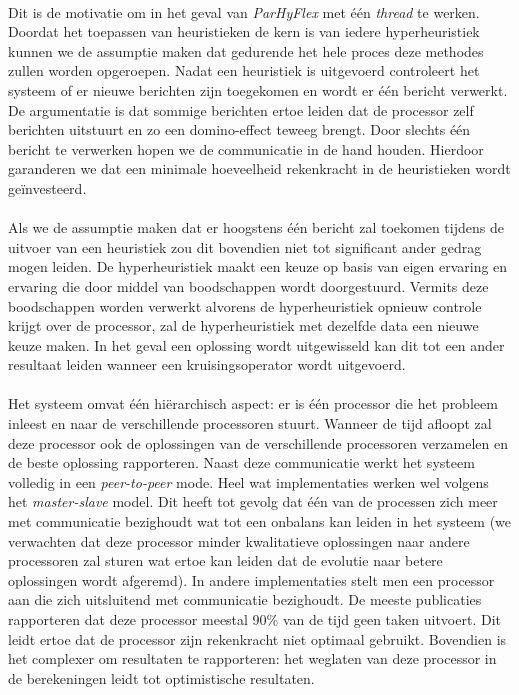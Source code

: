 \paragraph{}
Dit is de motivatie om in het geval van \emph{ParHyFlex} met \'e\'en \emph{thread} te werken. Doordat het toepassen van heuristieken de kern is van iedere hyperheuristiek kunnen we de assumptie maken dat gedurende het hele proces deze methodes zullen worden opgeroepen. Nadat een heuristiek is uitgevoerd controleert het systeem of er nieuwe berichten zijn toegekomen en wordt er \'e\'en bericht verwerkt. De argumentatie is dat sommige berichten ertoe leiden dat de processor zelf berichten uitstuurt en zo een domino-effect teweeg brengt. Door slechts \'e\'en bericht te verwerken hopen we de communicatie in de hand houden. Hierdoor garanderen we dat een minimale hoeveelheid rekenkracht in de heuristieken wordt ge\"investeerd.

\paragraph{}
Als we de assumptie maken dat er hoogstens \'e\'en bericht zal toekomen tijdens de uitvoer van een heuristiek zou dit bovendien niet tot significant ander gedrag mogen leiden. De hyperheuristiek maakt een keuze op basis van eigen ervaring en ervaring die door middel van boodschappen wordt doorgestuurd. Vermits deze boodschappen worden verwerkt alvorens de hyperheuristiek opnieuw controle krijgt over de processor, zal de hyperheuristiek met dezelfde data een nieuwe keuze maken. In het geval een oplossing wordt uitgewisseld kan dit tot een ander resultaat leiden wanneer een kruisingsoperator wordt uitgevoerd. 

\paragraph{}
Het systeem omvat \'e\'en hi\"erarchisch aspect: er is \'e\'en processor die het probleem inleest en naar de verschillende processoren stuurt. Wanneer de tijd afloopt zal deze processor ook de oplossingen van de verschillende processoren verzamelen en de beste oplossing rapporteren. Naast deze communicatie werkt het systeem volledig in een \emph{peer-to-peer} mode. Heel wat implementaties werken wel volgens het \emph{master-slave} model\cite{}. Dit heeft tot gevolg dat \'e\'en van de processen zich meer met communicatie bezighoudt wat tot een onbalans kan leiden in het systeem (we verwachten dat deze processor minder kwalitatieve oplossingen naar andere processoren zal sturen wat ertoe kan leiden dat de evolutie naar betere oplossingen wordt afgeremd). In andere implementaties\cite{} stelt men een processor aan die zich uitsluitend met communicatie bezighoudt. De meeste publicaties rapporteren dat deze processor meestal 90\% van de tijd geen taken uitvoert. Dit leidt ertoe dat de processor zijn rekenkracht niet optimaal gebruikt. Bovendien is het complexer om resultaten te rapporteren: het weglaten van deze processor in de berekeningen leidt tot optimistische resultaten.


